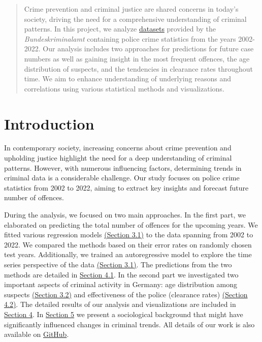 \documentclass{article}
\theoremstyle{plain}
\theoremstyle{definition}
\theoremstyle{remark}
\begin{document}
\printAffiliationsAndNotice{\icmlEqualContribution} %

\begin{abstract}
Crime prevention and criminal justice are shared concerns in today's society,  driving the need for a comprehensive understanding of criminal patterns. In this project, we analyze \href{https://www.bka.de/EN/CurrentInformation/Statistics/PoliceCrimeStatistics/policecrimestatistics_node.html}{datasets} provided by the \textit{Bundeskriminalamt} containing police crime statistics from the years 2002-2022. Our analysis includes two approaches for predictions for future case numbers as well as gaining insight in the most frequent offences, the age distribution of suspects, and the tendencies in clearance rates throughout time. We aim to enhance understanding of underlying reasons and correlations using various statistical methods and visualizations.
\end{abstract}

\section{Introduction}\label{sec:intro}
In contemporary society, increasing concerns about crime prevention and upholding justice highlight the need for a deep understanding of criminal patterns. However, with numerous influencing factors, determining trends in criminal data is a considerable challenge. Our study focuses on police crime statistics from 2002 to 2022, aiming to extract key insights and forecast future number of offences.

During the analysis, we focused on two main approaches. In the first part, we elaborated on predicting the total number of offences for the upcoming years. We fitted various regression models \hyperref[subsec:methods_prediction]{(Section 3.1)} to the data spanning from 2002 to 2022. We compared the methods based on their error rates on randomly chosen test years. Additionally, we trained an autoregressive model to explore the time series perspective of the data \hyperref[subsec:methods_prediction]{(Section 3.1)}. The predictions from the two methods are detailed in \hyperref[subsec:results_pred]{Section 4.1}. In the second part we investigated two important aspects of criminal activity in Germany: age distribution among suspects \hyperref[subsec:methods_age]{(Section 3.2)} and effectiveness of the police (clearance rates) \hyperref[subsec:results_age]{(Section 4.2)}. The detailed results of our analysis and visualizations are included in \hyperref[sec:results]{Section 4}. In \hyperref[sec:conclusion]{Section 5} we present a sociological background that might have significantly influenced changes in criminal trends. All details of our work is also available on \href{https://github.com/rojan-abolhasani/Order-in-Chaos-Understanding-Criminal-Patterns-in-Germany}{GitHub}.
\end{document}
